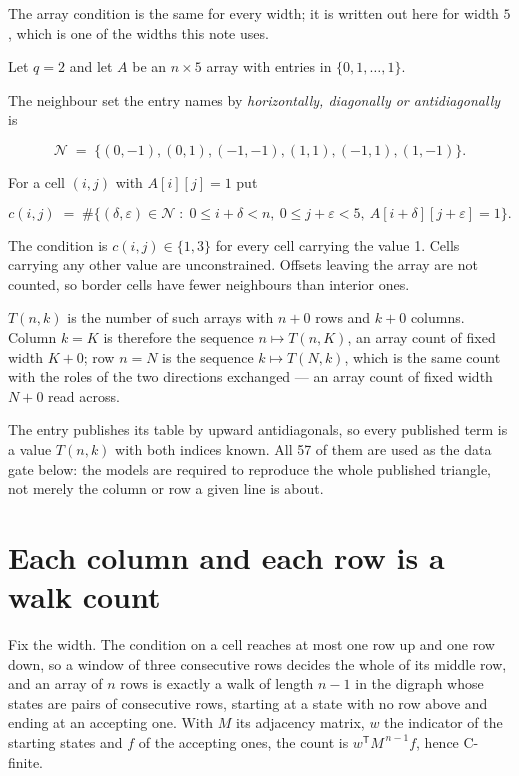 \documentclass[11pt]{article}
\theoremstyle{definition}
\begin{document}
The array condition is the same for every width; it is written out here for width $5$, which is one of the widths this note uses.

Let $q = 2$ and let $A$ be an $n \times 5$ array with entries in $\{0,1,\dots,1\}$.

The neighbour set the entry names by {\itshape horizontally, diagonally or antidiagonally} is

\[\mathcal{N} \;=\; \{(0,-1), (0,1), (-1,-1), (1,1), (-1,1), (1,-1)\}.\]

For a cell $(i,j)$ with $A[i][j] = 1$ put

\[c(i,j) \;=\; \#\bigl\{(\delta,\varepsilon)\in\mathcal{N} \;:\; 0\le i+\delta<n,\ 0\le j+\varepsilon<5,\ A[i+\delta][j+\varepsilon] = 1\bigr\}.\]

The condition is $c(i,j) \in \{1, 3\}$ for every cell carrying the value 1. Cells carrying any other value are unconstrained. Offsets leaving the array are not counted, so border cells have fewer neighbours than interior ones.

$T(n,k)$ is the number of such arrays with $n + 0$ rows and $k + 0$ columns. Column $k = K$ is therefore the sequence $n \mapsto T(n,K)$, an array count of fixed width $K + 0$; row $n = N$ is the sequence $k \mapsto T(N,k)$, which is the same count with the roles of the two directions exchanged --- an array count of fixed width $N + 0$ read across.

The entry publishes its table by upward antidiagonals, so every published term is a value $T(n,k)$ with both indices known. All 57 of them are used as the data gate below: the models are required to reproduce the whole published triangle, not merely the column or row a given line is about.

\section{Each column and each row is a walk count}

Fix the width. The condition on a cell reaches at most one row up and one row down, so a window of three consecutive rows decides the whole of its middle row, and an array of $n$ rows is exactly a walk of length $n-1$ in the digraph whose states are pairs of consecutive rows, starting at a state with no row above and ending at an accepting one. With $M$ its adjacency matrix, $w$ the indicator of the starting states and $f$ of the accepting ones, the count is $w^{\mathsf T}M^{\,n-1}f$, hence C-finite.
\end{document}
